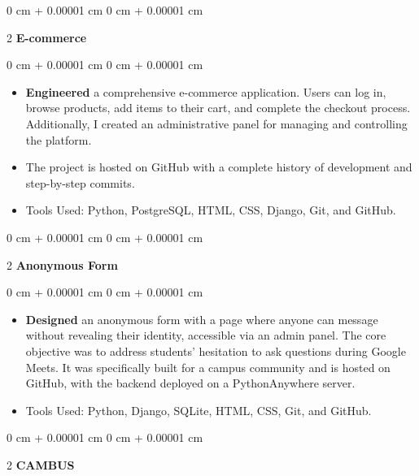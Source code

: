 \documentclass[10pt, letterpaper]{article}
\newenvironment{highlights}{ \begin{itemize}[ topsep=0.10 cm, parsep=0.10 cm, partopsep=0pt,
itemsep=0pt, leftmargin=0 cm + 10pt ] }{ \end{itemize} } %
\newenvironment{onecolentry}{ \begin{adjustwidth}{ 0 cm + 0.00001 cm }{ 0 cm + 0.00001 cm }
}{ \end{adjustwidth} } %
\newenvironment{twocolentry}[2][]{ \onecolentry \def\secondColumn{#2} \setcolumnwidth{\fill, 4.5 cm}
\begin{paracol}{2} }{ \switchcolumn \raggedleft \secondColumn \end{paracol}
\endonecolentry } %
\begin{document}
	\vspace{0.2 cm}

	\begin{twocolentry}
		{
		} \textbf{E-commerce}
	\end{twocolentry}

	\vspace{0.10 cm}
	\begin{onecolentry}
		\begin{highlights}
			\item \textbf{Engineered} a comprehensive e-commerce application. Users can
			log in, browse products, add items to their cart, and complete the
			checkout process. Additionally, I created an administrative panel for
			managing and controlling the platform.

			\item The project is hosted on GitHub with a complete history of
			development and step-by-step commits.
			\item Tools Used: Python, PostgreSQL, HTML, CSS,
			Django, Git, and GitHub.
		\end{highlights}
	\end{onecolentry}

	\vspace{0.2 cm}

	\begin{twocolentry}
		{
		} \textbf{Anonymous Form}
	\end{twocolentry}

	\vspace{0.10 cm}
	\begin{onecolentry}
		\begin{highlights}
			\item \textbf{Designed} an anonymous form with a page where anyone can
			message without revealing their identity, accessible via an admin panel.
			The core objective was to address students' hesitation to ask questions during
			Google Meets. It was specifically built for a campus community and is
			hosted on GitHub, with the backend deployed on a PythonAnywhere server.
			\item Tools Used: Python, Django, SQLite, HTML, CSS, Git, and GitHub.
		\end{highlights}
	\end{onecolentry}
	\vspace{0.2 cm}
	\begin{twocolentry}
		{
		} \textbf{CAMBUS}
	\end{twocolentry}
\end{document}
